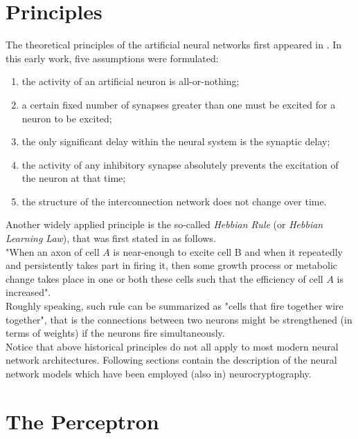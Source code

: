 \documentclass[%
    corpo=11pt,
    twoside,
    stile=classica,
    oldstyle,
    autoretitolo,
    tipotesi=magistrale,
    greek,
    evenboxes,
    english
]{toptesi}
\begin{document}
\section{Principles}
The theoretical principles of the artificial neural networks first appeared in \cite{mcculloch}. In this early work, five assumptions were formulated:
\begin{enumerate}
\item the activity of an artificial neuron is all-or-nothing;
\item a certain fixed number of synapses greater than one must be excited for a neuron to be excited;
\item the only significant delay within the neural system is the synaptic delay;
\item the activity of any inhibitory synapse absolutely prevents the excitation of the neuron at that time;
\item the structure of the interconnection network does not change over time.
\end{enumerate}
Another widely applied principle is the so-called \textit{Hebbian Rule} (or \textit{Hebbian Learning Law}), that was first stated in \cite{hebb} as follows. \\
"When an axon of cell $A$ is near-enough to excite cell B and when it repeatedly and persistently takes part in firing it, then some growth process or metabolic change takes place in one or both these cells such that the efficiency of cell $A$ is increased". \\
Roughly speaking, such rule can be summarized as "cells that fire together wire together", that is the connections between two neurons might be strengthened (in terms of weights) if the neurons fire simultaneously. \\
Notice that above historical principles do not all apply to most modern neural network architectures. Following sections contain the description of the neural network models which have been employed (also in) neurocryptography.
\section{The Perceptron}
\end{document}
